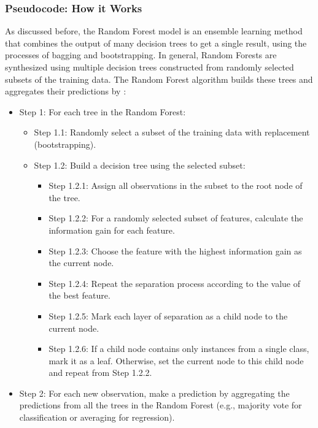 \begin{appendices}
    \subsubsection{Pseudocode: How it Works}

    As discussed before, the Random Forest model is an ensemble learning method that combines the output of many decision trees to get a single result, using the processes of bagging and bootstrapping. 
  In general, Random Forests are synthesized using multiple decision trees constructed from randomly selected subsets of the training data. The Random Forest algorithm builds these trees and aggregates their predictions by \cite{bernstein}:

    \begin{itemize}
        \item Step 1: For each tree in the Random Forest:
        \begin{itemize}
            \item Step 1.1: Randomly select a subset of the training data with replacement (bootstrapping).
            \item Step 1.2: Build a decision tree using the selected subset:
            \begin{itemize}
                \item Step 1.2.1: Assign all observations in the subset to the root node of the tree.
                \item Step 1.2.2: For a randomly selected subset of features, calculate the information gain for each feature.
                \item Step 1.2.3: Choose the feature with the highest information gain as the current node.
                \item Step 1.2.4: Repeat the separation process according to the value of the best feature.
                \item Step 1.2.5: Mark each layer of separation as a child node to the current node.
                \item Step 1.2.6: If a child node contains only instances from a single class, mark it as a leaf. Otherwise, set the current node to this child node and repeat from Step 1.2.2.
            \end{itemize}
        \end{itemize}
        \item Step 2: For each new observation, make a prediction by aggregating the predictions from all the trees in the Random Forest (e.g., majority vote for classification or averaging for regression).
    \end{itemize}


\end{appendices}

